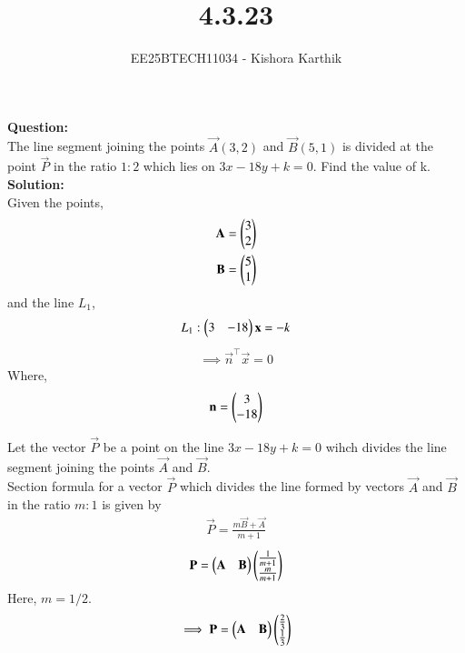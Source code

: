 \documentclass[journal]{IEEEtran}
\begin{document}

\vspace{1cm}

\title{4.3.23}
\author{EE25BTECH11034 - Kishora Karthik}
{\let\newpage\relax\maketitle}

\renewcommand{\thefigure}{\theenumi}
\renewcommand{\thetable}{\theenumi}
\textbf{Question:}\\
The line segment joining the points $\vec{A}(3,2)$ and $\vec{B}(5,1)$ is divided at the point $\vec{P}$ in the ratio $1:2$ which lies on $3x - 18y+k=0$. Find the value of k.\\

\textbf{Solution:}\\
Given the points,
\begin{align}
    \vec{A}=\begin{myvec}{3\\2}\end{myvec}\\ 
    \vec{B}=\begin{myvec}{5\\1}\end{myvec}
\end{align}
and the line $L_1$,
\begin{align}
    L_1: \begin{pmatrix}3 & -18\end{pmatrix}\mathbf{x} = -k
\end{align}
\begin{align}
    \implies \vec{n}^{\top}\vec{x}=0
\end{align}
Where,
\begin{align}
     \mathbf{n}=\begin{pmatrix}3\\-18\end{pmatrix}
\end{align}

\bigskip

Let the vector $\vec{P}$ be a point on the line $3x - 18y+k=0$ wihch divides the line segment joining the points $\vec{A}$ and $\vec{B}$.
\\
Section formula for a vector $\vec{P}$ which divides the line formed by vectors $\vec{A}$ and $\vec{B}$ in the ratio $m:1$ is given by
\begin{align}
    \vec{P}=\frac{m\vec{B}+\vec{A}}{m+1}
\end{align}
\begin{align}
	\mathbf{P}=\begin{pmatrix}\mathbf{A} & \mathbf{B}\end{pmatrix}\begin{pmatrix}\frac{1}{m+1}\\\frac{m}{m+1}\end{pmatrix}
\end{align}
Here, $m=1/2$.
\begin{align}
    \implies \mathbf{P}=\begin{pmatrix}\mathbf{A} & \mathbf{B}\end{pmatrix}\begin{pmatrix}\frac{2}{3}\\\frac{1}{3}\end{pmatrix}
\end{align}\\
\bigskip
\end{document}
